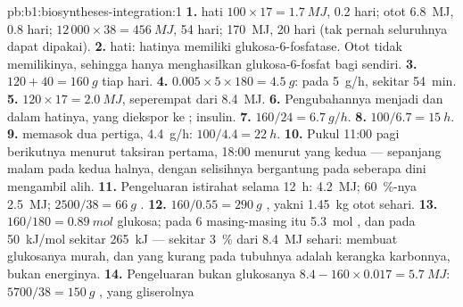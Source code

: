 \begin{solution}{pb:b1:biosyntheses-integration:1}
\textbf{1.}  hati $100\times 17 = \qty{1.7}{MJ}$, 0.2 hari;
 otot \qty{6.8}{MJ}, 0.8 hari;  $12\,000\times 38 =
\qty{456}{MJ}$, 54 hari;  \qty{170}{MJ}, 20 hari (tak pernah
seluruhnya dapat dipakai).
\textbf{2.}  hati: hatinya memiliki glukosa-6-fosfatase.
Otot tidak memilikinya, sehingga  hanya menghasilkan
glukosa-6-fosfat bagi  sendiri.
\textbf{3.} $120 + 40 = \qty{160}{g}$ tiap hari.
\textbf{4.} $0.005\times 5\times 180 = \qty{4.5}{g}$: pada \qty{5}{g/h}, sekitar \qty{54}{min}.
\textbf{5.} $120\times 17 = \qty{2.0}{MJ}$, seperempat dari \qty{8.4}{MJ}.
\textbf{6.} Pengubahannya menjadi  dan  dalam
hatinya, yang diekspor ke  ; insulin.
\textbf{7.} $160/24 = \qty{6.7}{g/h}$.
\textbf{8.} $100/6.7 = \qty{15}{h}$.
\textbf{9.}  memasok dua pertiga, \qty{4.4}{g/h}: $100/4.4 =
\qty{22}{h}$.
\textbf{10.} Pukul 11:00 pagi berikutnya menurut taksiran pertama,
18:00 menurut yang kedua --- sepanjang malam pada kedua halnya, dengan
selisihnya bergantung pada seberapa dini  mengambil
alih.
\textbf{11.} Pengeluaran istirahat selama \qty{12}{h}: \qty{4.2}{MJ};
\qty{60}{\%}-nya \qty{2.5}{MJ}; $2500/38 = \qty{66}{g}$ .
\textbf{12.} $160/0.55 = \qty{290}{g}$ , yakni \qty{1.45}{kg}
otot sehari.
\textbf{13.} $160/180 = \qty{0.89}{mol}$ glukosa; pada 6 
masing-masing itu \qty{5.3}{mol} , dan pada \qty{50}{kJ/mol} sekitar
\qty{265}{kJ} --- sekitar \qty{3}{\%} dari \qty{8.4}{MJ} sehari:
membuat glukosanya murah, dan yang kurang pada tubuhnya adalah kerangka
karbonnya, bukan energinya.
\textbf{14.} Pengeluaran bukan glukosanya $8.4 - 160\times 0.017 =
\qty{5.7}{MJ}$: $5700/38 = \qty{150}{g}$ , yang gliserolnya

\end{solution}

